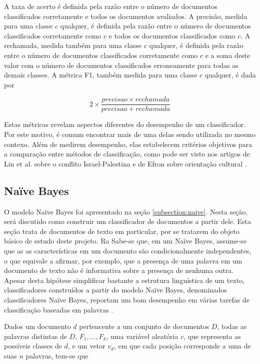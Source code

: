 A taxa de acerto é definida pela razão entre o número de documentos classificados corretamente e todos os documentos avaliados. A precisão, medida para uma classe \ensuremath{c} qualquer, é definida pela razão entre o número de documentos classificados corretamente como \ensuremath{c} e todos os documentos classificados como \ensuremath{c}. A rechamada, medida também para uma classe \ensuremath{c} qualquer, é definida pela razão entre o número de documentos classificados corretamente como \ensuremath{c} e a soma deste valor com o número de documentos classificados erroneamente para todas as demais classes. A métrica F1, também medida para uma classe \ensuremath{c} qualquer, é dada por

\begin{equation}
\ensuremath{2 \times \frac{precisao \times rechamada}{precisao + rechamada}}
\end{equation} 

Estas métricas revelam aspectos diferentes do desempenho de um classificador. Por este motivo, é comum encontrar mais de uma delas sendo utilizada no mesmo contexo. Além de medirem desempenho, elas estabelecem critérios objetivos para a comparação entre métodos de classificação, como pode ser visto nos artigos de Lin et al. sobre o conflito Israel-Palestina \cite{lin-et-al2006} e de Efron sobre orientação cultural \cite{efron}. 

\subsection{Naïve Bayes}
\label{subsection:bayes}

O modelo Naïve Bayes foi apresentado na seção \ref{subsection:naive}. Nesta seção, será discutido como construir um classificador de documentos a partir dele. Esta seção trata de documentos de texto em particular, por se tratarem do objeto básico de estudo deste projeto. 
Ra
Sabe-se que, em um Naïve Bayes, assume-se que as as características em um documento são condicionalmente independentes, o que equivale a afirmar, por exemplo, que a presença de uma palavra em um documento de texto não é informativa sobre a presença de nenhuma outra. Apesar desta hipótese simplificar bastante a estrutura linguística de um texto, classificadores construídos a partir do modelo Naïve Bayes, denominados classificadores Naïve Bayes, reportam um bom desempenho em várias tarefas de classificação baseadas em palavras \cite{naive-at-forty} \cite{mccallum-naive}.

Dados um documento \ensuremath{d} pertencente a um conjunto de documentos \ensuremath{D}, todas as palavras distintas de \ensuremath{D}, \ensuremath{F_1, ..., F_k}, uma variável aleatória \ensuremath{c}, que representa as possíveis classes de \ensuremath{d}, e um vetor \ensuremath{v_d}, em que cada posição corresponde a uma de suas \ensuremath{n} palavras, tem-se que
 
